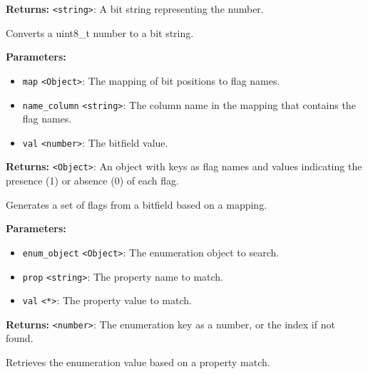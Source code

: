 \documentclass[12pt,a4paper]{article}
\begin{document}
\noindent \textbf{Returns:} \texttt{<string>}: A bit string representing the number.

\noindent Converts a uint8\_t number to a bit string.

\vspace{5mm}
\noindent {}


\noindent \textbf{Parameters:}
\begin{itemize}
  \item \texttt{map} \texttt{<Object>}: The mapping of bit positions to flag names.
  \item \texttt{name\_column} \texttt{<string>}: The column name in the mapping that contains the flag names.
  \item \texttt{val} \texttt{<number>}: The bitfield value.
\end{itemize}

\noindent \textbf{Returns:} \texttt{<Object>}: An object with keys as flag names and values indicating the presence (1) or absence (0) of each flag.

\noindent Generates a set of flags from a bitfield based on a mapping.

\vspace{5mm}
\noindent {}


\noindent \textbf{Parameters:}
\begin{itemize}
  \item \texttt{enum\_object} \texttt{<Object>}: The enumeration object to search.
  \item \texttt{prop} \texttt{<string>}: The property name to match.
  \item \texttt{val} \texttt{<*>}: The property value to match.
\end{itemize}

\noindent \textbf{Returns:} \texttt{<number>}: The enumeration key as a number, or the index if not found.

\noindent Retrieves the enumeration value based on a property match.

\vspace{5mm}
\noindent {}
\end{document}
